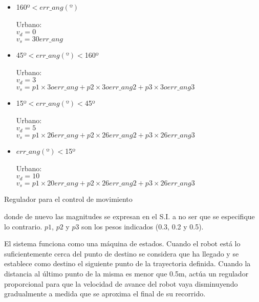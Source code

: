 \begin{table} \label{vel2}
\begin{itemize}

  \item 160º$<err\_ang(º)$

        \begin{tabbing}
        Urbano:\\  
        $v_{d}=0$ \\
        $v_{s}=30err\_ang$
        \end{tabbing}


  \item 45º$<err\_ang(º)<$160º

        \begin{tabbing}
        Urbano:\\
        $v_{d}=3$ \\
        $v_{s}=p1\times3oerr\_ang + p2\times3oerr\_ang2 + p3\times3oerr\_ang3$
        \end{tabbing}

  \item 15º$<err\_ang(º)<$45º

        \begin{tabbing}
        Urbano:\\
        $v_{d}=5$ \\
        $v_{s}=p1\times26err\_ang + p2\times26err\_ang2 + p3\times26err\_ang3$
        \end{tabbing}

  \item $err\_ang(º)<$15º

        \begin{tabbing}
        Urbano: \\
        $v_{d}=10$\\
        $v_{s}=p1\times20err\_ang + p2\times26err\_ang2 + p3\times26err\_ang3$
        \end{tabbing}
\end{itemize}

\caption{Regulador para el control de movimiento}
\end{table}

donde de nuevo las magnitudes se expresan en el S.I. a no ser que se especifique lo contrario. $p1$, $p2$ y $p3$ son los pesos indicados (0.3, 0.2 y 0.5).

El sistema funciona como una máquina de estados. Cuando el robot está lo suficientemente cerca del punto de destino se considera que ha llegado y se establece como destino el siguiente punto de la trayectoria definida. Cuando la distancia al último punto de la misma es menor que 0.5m, actúa un regulador proporcional para que la velocidad de avance del robot vaya disminuyendo gradualmente a medida que se aproxima el final de su recorrido.

